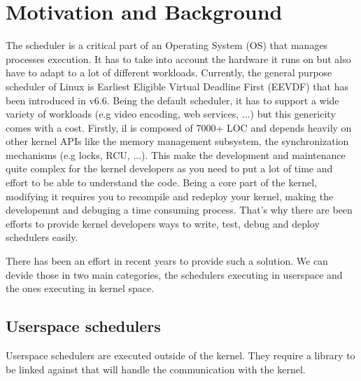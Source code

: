 \section{Motivation and Background}

\par The scheduler is a critical part of an Operating System (OS) that manages processes execution. It has to take into account the hardware it runs on but also have to adapt to a lot of different workloads. Currently, the general purpose scheduler of Linux is Earliest Eligible Virtual Deadline First (EEVDF) that has been introduced in v6.6. Being the default scheduler, it has to support a wide variety of workloads (e.g video encoding, web services,  ...) but this genericity comes with a cost. Firstly, il is composed of 7000+ LOC and depends heavily on other kernel APIs like the memory management subsystem, the synchronization mechanisms (e.g locks, RCU, ...). This make the development and maintenance quite complex for the kernel developers as you need to put a lot of time and effort to be able to understand the code. Being a core part of the kernel, modifying it requires you to recompile and redeploy your kernel, making the developemnt and debuging a time consuming process. That's why there are been efforts to provide kernel developers ways to write, test, debug and deploy schedulers easily. \\ \newline


\par There has been an effort in recent years to provide such a solution. We can devide those in two main categories, the schedulers executing in userspace and the ones executing in kernel space. \\

\subsection{Userspace schedulers}
\par Userspace schedulers are executed outside of the kernel. They require a library to be linked against that will handle the communication with the kernel. \\

